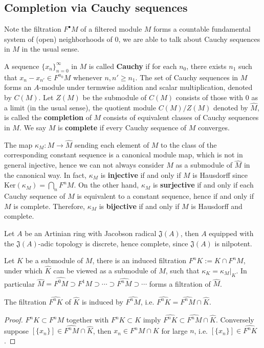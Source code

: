 \documentclass[10pt]{extarticle}
\begin{document}
\subsection{Completion via Cauchy sequences}
Note the filtration $F^\bullet M$ of a filtered module $M$ forms a countable fundamental system of (open) neighborhoods of $0$, we are able to talk about Cauchy sequences in $M$ in the usual sense.

A sequence $\{x_n\}_{n=0}^\infty$ in $M$ is called \textbf{Cauchy} if for each $n_0$, there exists $n_1$ such that $x_n-x_{n'}\in F^{n_0}M$ whenever $n,n'\geq n_1$. The set of Cauchy sequences in $M$ forms an $A$-module under termwise addition and scalar multiplication, denoted by $C(M)$. Let $Z(M)$ be the submodule of $C(M)$ consists of those with $0$ as a limit (in the usual sense), the quotient module $C(M)/Z(M)$ denoted by $\widehat{M}$, is called the \textbf{completion} of $M$ consists of equivalent classes of Cauchy sequences in $M$. We say $M$ is \textbf{complete} if every Cauchy sequence of $M$ converges.

The map $\kappa_M\colon M\to\widehat{M}$ sending each element of $M$ to the class of the corresponding constant sequence is a canonical module map, which is not in general injective, hence we can not always consider $M$ as a submodule of $\widehat{M}$ in the canonical way. In fact, $\kappa_M$ is \textbf{injective} if and only if $M$ is Hausdorff since $\text{Ker}(\kappa_M)=\bigcap_n F^nM$. On the other hand, $\kappa_M$ is \textbf{surjective} if and only if each Cauchy sequence of $M$ is equivalent to a constant sequence, hence if and only if $M$ is complete. Therefore, $\kappa_M$ is \textbf{bijective} if and only if $M$ is Hausdorff and complete.

\begin{example}
    Let $A$ be an Artinian ring with Jacobson radical $\mathfrak{J}(A)$, then $A$ equipped with the $\mathfrak{J}(A)$-adic topology is discrete, hence complete, since $\mathfrak{J}(A)$ is nilpotent.
\end{example}

Let $K$ be a submodule of $M$, there is an induced filtration $F^nK:=K\cap F^nM$, under which $\widehat{K}$ can be viewed as a submodule of $\widehat{M}$, such that $\kappa_K=\kappa_M|_K$. In particular $\widehat{M}=\widehat{F^0 M}\supset\widehat{F^1 M}\supset\cdots\supset\widehat{F^n M}\supset\cdots$ forms a filtration of $\widehat{M}$.

\begin{proposition}{}{}
    The filtration $\widehat{F^nK}$ of $\widehat{K}$ is induced by $\widehat{F^nM}$, i.e. $\widehat{F^nK}=\widehat{F^nM}\cap\widehat{K}$.
\end{proposition}
\begin{proof}
    $F^nK\subset F^nM$ together with $F^nK\subset K$ imply $\widehat{F^nK}\subset\widehat{F^nM}\cap\widehat{K}$. Conversely suppose $[\{x_n\}]\in\widehat{F^nM}\cap\widehat{K}$, then $x_n\in F^nM\cap K$ for large $n$, i.e. $[\{x_n\}]\in \widehat{F^nK}$.
\end{proof}
\end{document}
